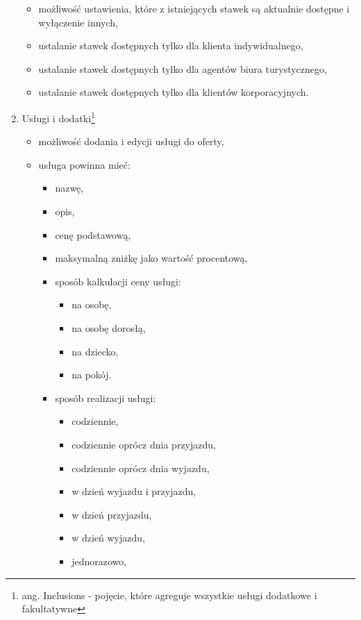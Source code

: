 \documentclass[a4paper,onecolumn,oneside,11pt,wide,floatssmall]{mwrep}
\theoremstyle{definition}
\theoremstyle{plain}%
\theoremstyle{remark}
\begin{document}
\begin{enumerate}
\begin{itemize}
\begin{itemize}
        \end{itemize}
      \item możliwość ustawienia, które z istniejących stawek są aktualnie dostępne i wyłączenie innych,
      \item ustalanie stawek dostępnych tylko dla klienta indywidualnego,
      \item ustalanie stawek dostępnych tylko dla agentów biura turystycznego,
      \item ustalanie stawek dostępnych tylko dla klientów korporacyjnych.
    \end{itemize}
  \item Usługi i dodatki\footnote{ang. Inclusions - pojęcie, które agreguje wszystkie usługi dodatkowe i fakultatywne}
    \begin{itemize}
      \item możliwość dodania i edycji usługi do oferty,
      \item usługa powinna mieć:
        \begin{itemize}
          \item nazwę,
          \item opis,
          \item cenę podstawową,
          \item maksymalną zniżkę jako wartość procentową,
          \item sposób kalkulacji ceny usługi:
            \begin{itemize}
              \item na osobę,
              \item na osobę dorosłą,
              \item na dziecko,
              \item na pokój.
            \end{itemize}
          \item sposób realizacji usługi:
            \begin{itemize}
              \item codziennie,
              \item codziennie oprócz dnia przyjazdu,
              \item codziennie oprócz dnia wyjazdu,
              \item w dzień wyjazdu i przyjazdu,
              \item w dzień przyjazdu,
              \item w dzień wyjazdu,
              \item jednorazowo,

\end{itemize}
\end{itemize}
\end{itemize}
\end{enumerate}
\end{document}
